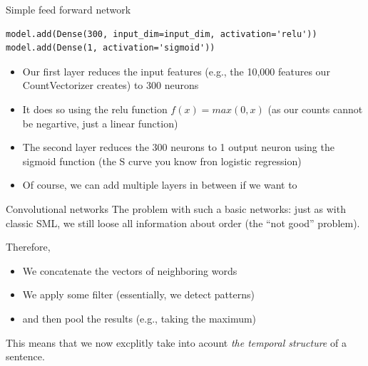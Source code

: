 \documentclass[compress]{beamer}
\begin{document}
\begin{frame}[fragile]{Simple feed forward network}
	\begin{lstlisting}
model.add(Dense(300, input_dim=input_dim, activation='relu'))
model.add(Dense(1, activation='sigmoid'))
	\end{lstlisting}	
	
	\begin{itemize}[<+->]
		\item Our first layer reduces the input features (e.g., the 10,000 features our CountVectorizer creates) to 300 neurons
		\item It does so using the relu function $f(x) = max(0, x)$ (as our counts cannot be negartive, just a linear function)
		\item The second layer reduces the 300 neurons to 1 output neuron using the sigmoid function (the S curve you know fron logistic regression)
		\item Of course, we can add multiple layers in between if we want to
	\end{itemize}
\end{frame}



\begin{frame}{Convolutional networks}
	The problem with such a basic networks: just as with classic SML, we still loose all information about order (the ``not good'' problem).
	
	Therefore,
	\begin{itemize}
		\item We concatenate the vectors of neighboring words
		\item We apply some filter (essentially, we detect patterns)
		\item and then pool the results (e.g., taking the maximum)
	\end{itemize}
	This means that we now excplitly take into acount \emph{the temporal structure} of a sentence.
\end{frame}
\end{document}
